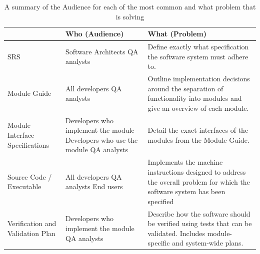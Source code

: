 \begin{table}[h]
\caption{A summary of the Audience for each of the most common \sfs{} and what 
problem that \sf{} is solving}
\label{tab:sfsummary}
\begin{tabular}{| P{.3\linewidth} | p{.3\linewidth}  | p{.3\linewidth} |}
\hline
 \SF{} & Who (Audience) & What (Problem)
\\ \hline
	SRS & 

	Software Architects \newline \newline
	QA analysts & 

	Define exactly what specification the software system must adhere to. 
\\ \hline
	Module Guide & 

	All developers \newline \newline
	QA analysts  & 

	Outline implementation decisions around the separation of functionality 
	into modules and give an overview of each module.
\\ \hline
	Module Interface Specifications & 

	Developers who implement the module \newline \newline
	Developers who use the module \newline \newline
	QA analysts & 

	Detail the exact interfaces of the modules from the Module Guide.
\\ \hline
	Source Code / Executable &
	
	All developers \newline \newline
	QA analysts \newline \newline 
	End users &

	Implements the machine instructions designed to address the overall problem 
	for which the software system has been specified
\\ \hline
	Verification and Validation Plan &
	
	Developers who implement the module \newline \newline
	QA analysts &

	Describe how the software should be verified using tests that can be 
	validated. Includes module-specific and system-wide plans.
\\ \hline
\end{tabular}
\end{table}


